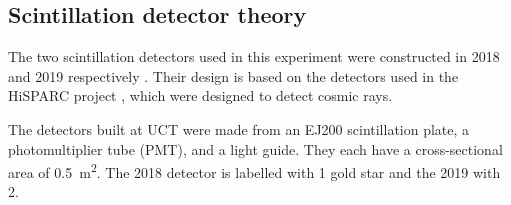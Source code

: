 \documentclass[11pt]{article}
\numberwithin{equation}{section}
\numberwithin{figure}{section}
\numberwithin{table}{section}
\begin{document}
\subsection{Scintillation detector theory}\label{sec:scintillator theory}
\par The two scintillation detectors used in this experiment were constructed in 2018 and 2019 respectively \cite{2018 report}\cite{2019 report}. Their design is based on the detectors used in the HiSPARC project \cite{HISPARC}, which were designed to detect cosmic rays. 
\par The detectors built at UCT were made from an EJ200 scintillation plate, a photomultiplier tube (PMT), and a light guide. They each have a cross-sectional area of \SI{0.5}{\metre^2}. The 2018 detector is labelled with 1 gold star and the 2019 with 2.

\end{document}
